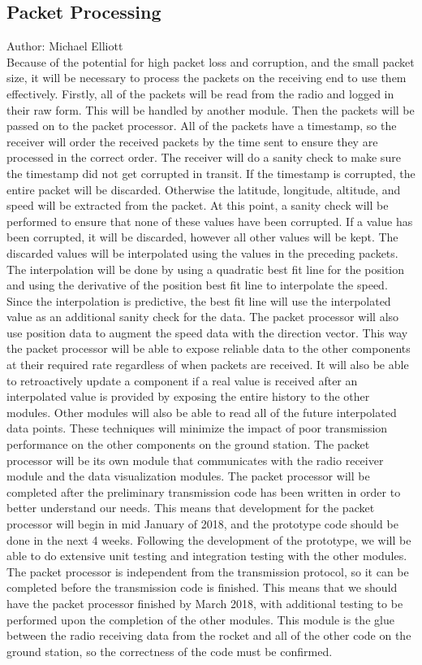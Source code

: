 \documentclass[onecolumn, draftclsnofoot,10pt, compsoc]{IEEEtran}
\begin{document}
\subsection{Packet Processing}
Author: Michael Elliott\\
Because of the potential for high packet loss and corruption, and the
small packet size, it will be necessary to process the packets on the
receiving end to use them effectively.
Firstly, all of the packets will be read from the radio and logged in
their raw form.
This will be handled by another module.
Then the packets will be passed on to the packet processor.
All of the packets have a timestamp, so the receiver will order the
received packets by the time sent to ensure they are processed in the
correct order.
The receiver will do a sanity check to make sure the timestamp did not
get corrupted in transit.
If the timestamp is corrupted, the entire packet will be discarded.
Otherwise the latitude, longitude, altitude, and speed will be
extracted from the packet.
At this point, a sanity check will be performed to ensure that none of
these values have been corrupted.
If a value has been corrupted, it will be discarded, however all other
values will be kept.
The discarded values will be interpolated using the values in the
preceding packets.
The interpolation will be done by using a quadratic best fit line for
the position and using the derivative of the position best fit line to
interpolate the speed.
Since the interpolation is predictive, the best fit line will use the
interpolated value as an additional sanity check for the data.
The packet processor will also use position data to augment the speed
data with the direction vector.
This way the packet processor will be able to expose reliable data to
the other components at their required rate regardless of when packets
are received.
It will also be able to retroactively update a component if a real
value is received after an interpolated value is provided by exposing
the entire history to the other modules.
Other modules will also be able to read all of the future interpolated
data points.
These techniques will minimize the impact of poor transmission
performance on the other components on the ground station.
The packet processor will be its own module that communicates with the
radio receiver module and the data visualization modules.
The packet processor will be completed after the preliminary
transmission code has been written in order to better understand our
needs.
This means that development for the packet processor will begin in mid
January of 2018, and the prototype code should be done in the next 4
weeks.
Following the development of the prototype, we will be able to do
extensive unit testing and integration testing with the other modules.
The packet processor is independent from the transmission protocol, so
it can be completed before the transmission code is finished.
This means that we should have the packet processor finished by March
2018, with additional testing to be performed upon the completion of
the other modules.
This module is the glue between the radio receiving data from the
rocket and all of the other code on the ground station, so the
correctness of the code must be confirmed.
\end{document}
